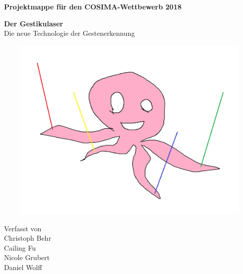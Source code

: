 
\begin{titlepage}

    
    \small
	\parindent0pt
	
	\begin{center}
		\bfseries Projektmappe für den COSIMA-Wettbewerb 2018
	\end{center}
	\vspace*{15mm}
	\normalsize	
	\begin{center}
		\huge
		{\bfseries\sffamily Der Gestikulaser}
		\\ \vspace*{4mm}
		\large
		Die neue Technologie der Gestenerkennung
	\end{center}
	\vfill
	\begin{center}
	\large \mydate{\today}
	\end{center}
	\includegraphics[width=15cm,height=9cm]{../figures/GestikulaserLogo.png}
	\vfill
	\begin{center}
		Verfasst von \\[3ex]
		Christoph Behr \\
		Cailing Fu \\
		Nicole Grubert \\
		Daniel Wolff \\
	\end{center}
\end{titlepage}